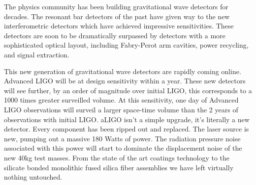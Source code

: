 

%

The physics community has been building gravitational wave detectors for
decades.
The resonant bar detectors of the past have given way to the new
interferometric detectors which have achieved impressive sensitivities.
These detectors are soon to be dramatically surpassed
by detectors with a more sophisticated optical layout, including Fabry-Perot
arm cavities, power recycling, and signal extraction.


This new generation of gravitational wave detectors are rapidly coming
online.
Advanced LIGO will be at design sensitivity within a year.
These new detectors will see further, by an order of magnitude over
initial LIGO, this corresponds to a 1000 times greater surveilled volume.
At this sensitivity, one day of Advanced LIGO observations will surveil a
larger space-time volume than the 2 years of observations with initial LIGO.
aLIGO isn't a simple upgrade, it's literally a new detector.
Every component has been ripped out and replaced.
The laser source is new, pumping out a massive
180 Watts of power.
The radiation pressure noise associated with this power will start to
dominate the displacement noise of the new 40kg test masses.
From the state of the art coatings technology to the silicate bonded
monolithic fused silica fiber assemblies we have left virtually
nothing untouched.

